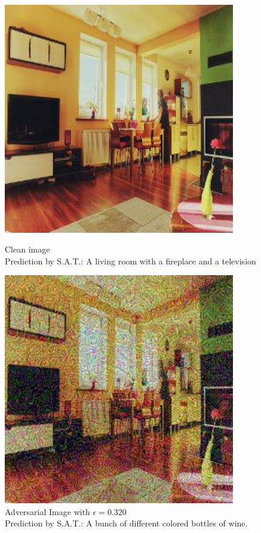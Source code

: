 \begin{figure}[ht]
    \centering
    \begin{minipage}{0.45\textwidth}
        \centering
        \includegraphics[width=0.9\textwidth]{../code/ShowDistractAndDeceive/samples/0.000/img_0.jpg} %
        \caption*{Clean image\\Prediction by S.A.T.: A living room with a fireplace and a television}
    \end{minipage}\hfill
    \begin{minipage}{0.45\textwidth}
        \centering
        \includegraphics[width=0.9\textwidth]{../code/ShowDistractAndDeceive/samples/0.320/img_0.jpg} %
        \caption*{Adversarial Image with $\epsilon=0.320$\\Prediction by S.A.T.: A bunch of different colored bottles of wine.}
    \end{minipage}
\end{figure}

